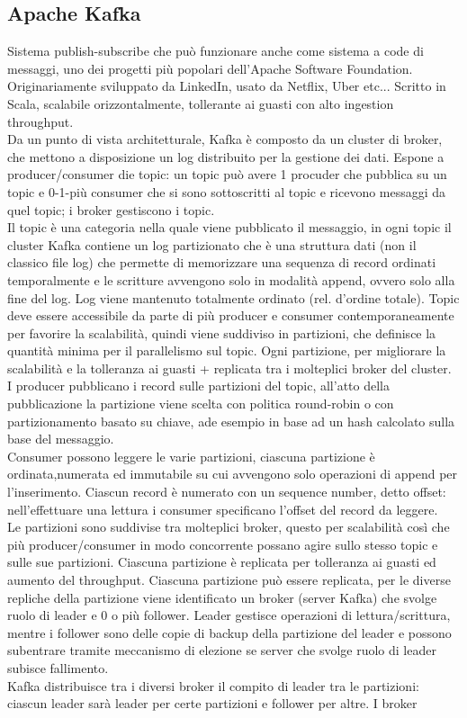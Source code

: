 \documentclass[16px]{article}
\begin{document}
\subsection{Apache Kafka}
Sistema publish-subscribe che può funzionare anche come sistema a code di messaggi, uno dei progetti più popolari dell'Apache Software Foundation.\\ Originariamente sviluppato da LinkedIn, usato da Netflix, Uber etc... Scritto in Scala, scalabile orizzontalmente, tollerante ai guasti con alto ingestion throughput.\\ Da un punto di vista architetturale, Kafka è composto da un cluster di broker, che mettono a disposizione un log distribuito per la gestione dei dati. Espone a producer/consumer die topic: un topic può avere 1 procuder che pubblica su un topic e 0-1-più consumer che si sono sottoscritti al topic e ricevono messaggi da quel topic; i broker gestiscono i topic.\\ Il topic è una categoria nella quale viene pubblicato il messaggio, in ogni topic il cluster Kafka contiene un log partizionato che è una struttura dati (non il classico file log) che permette di memorizzare una sequenza di record ordinati temporalmente e le scritture avvengono solo in modalità append, ovvero solo alla fine del log. Log viene mantenuto totalmente ordinato (rel. d'ordine totale). Topic deve essere accessibile da parte di più producer e consumer contemporaneamente per favorire la scalabilità, quindi viene suddiviso in partizioni, che definisce la quantità minima per il parallelismo sul topic. Ogni partizione, per migliorare la scalabilità e la tolleranza ai guasti + replicata tra i molteplici broker del cluster.\\ I producer pubblicano i record sulle partizioni del topic, all'atto della pubblicazione la partizione viene scelta con politica round-robin o con partizionamento basato su chiave, ade esempio in base ad un hash calcolato sulla base del messaggio. \\ Consumer possono leggere le varie partizioni, ciascuna partizione è ordinata,numerata ed immutabile su cui avvengono solo operazioni di append per l'inserimento. Ciascun record è numerato con un sequence number, detto offset: nell'effettuare una lettura i consumer specificano l'offset del record da leggere.\\ Le partizioni sono suddivise tra molteplici broker, questo per scalabilità così che più producer/consumer in modo concorrente possano agire sullo stesso topic e sulle sue partizioni. Ciascuna partizione è replicata per tolleranza ai guasti ed aumento del throughput. Ciascuna partizione può essere replicata, per le diverse repliche della partizione viene identificato un broker (server Kafka) che svolge ruolo di leader e 0 o più follower. Leader gestisce operazioni di lettura/scrittura, mentre i follower sono delle copie di backup della partizione del leader e possono subentrare tramite meccanismo di elezione se server che svolge ruolo di leader subisce fallimento.\\ Kafka distribuisce tra i diversi broker il compito di leader tra le partizioni: ciascun leader sarà leader per certe partizioni e follower per altre. I broker 
\end{document}
